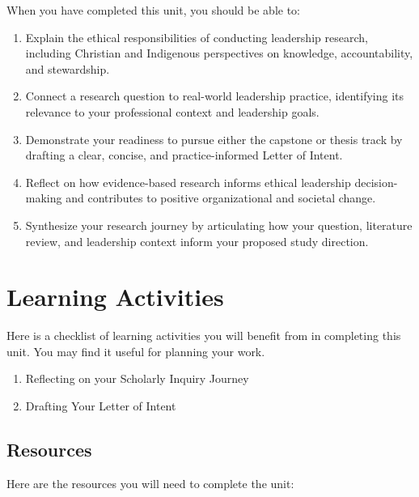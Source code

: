 \documentclass[
  letterpaper,
  DIV=11,
  numbers=noendperiod]{scrreprt}
\providecommand{\tightlist}{%
  \setlength{\itemsep}{0pt}\setlength{\parskip}{0pt}}\usepackage{longtable,booktabs,array}
\begin{document}

When you have completed this unit, you should be able to:

\begin{enumerate}
\def\labelenumi{\arabic{enumi}.}
\tightlist
\item
  Explain the ethical responsibilities of conducting leadership
  research, including Christian and Indigenous perspectives on
  knowledge, accountability, and stewardship.
\item
  Connect a research question to real-world leadership practice,
  identifying its relevance to your professional context and leadership
  goals.
\item
  Demonstrate your readiness to pursue either the capstone or thesis
  track by drafting a clear, concise, and practice-informed Letter of
  Intent.
\item
  Reflect on how evidence-based research informs ethical leadership
  decision-making and contributes to positive organizational and
  societal change.
\item
  Synthesize your research journey by articulating how your question,
  literature review, and leadership context inform your proposed study
  direction.
\end{enumerate}

\section*{Learning Activities}\label{learning-activities-5}


Here is a checklist of learning activities you will benefit from in
completing this unit. You may find it useful for planning your work.

\begin{enumerate}
\def\labelenumi{\arabic{enumi}.}
\tightlist
\item
  Reflecting on your Scholarly Inquiry Journey
\item
  Drafting Your Letter of Intent
\end{enumerate}

\subsection*{Resources}\label{resources-5}

Here are the resources you will need to complete the unit:
\end{document}
